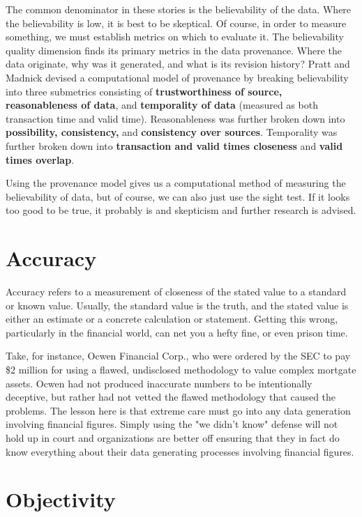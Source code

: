 The common denominator in these stories is the believability of the data. Where the believability is low, it is best to be skeptical.
Of course, in order to measure something, we must establish metrics on which to evaluate it. The believability quality dimension 
finds its primary metrics in the data provenance. Where the data originate, why was it generated, and what is its revision history? 
Pratt and Madnick \cite{provenance} devised a computational model of provenance by breaking believability into three submetrics 
consisting of \textbf{trustworthiness of source, reasonableness of data}, and \textbf{temporality of data} (measured as both transaction time and valid time). Reasonableness was further broken down into \textbf{possibility, consistency,} and \textbf{consistency over sources}. Temporality was further broken down into \textbf{transaction and valid times closeness} and \textbf{valid times overlap}.

Using the provenance model gives us a computational method of measuring the believability of data, but of course, we can also
just use the sight test. If it looks too good to be true, it probably is and skepticism and further research is advised.

\section{Accuracy}

Accuracy refers to a measurement of closeness of the stated value to a standard or known value. Usually, the standard value is
the truth, and the stated value is either an estimate or a concrete calculation or statement. Getting this wrong, particularly
in the financial world, can net you a hefty fine, or even prison time.

Take, for instance, Ocwen Financial Corp., who were ordered by the SEC to pay \$2 million for using a flawed, undisclosed
methodology to value complex mortgate assets. \cite{ocwen} \cite{ocwenreuters} Ocwen had not produced inaccurate numbers
to be intentionally deceptive, but rather had not vetted the flawed methodology that caused the problems. The lesson here
is that extreme care must go into any data generation involving financial figures. Simply using the "we didn't know" defense
will not hold up in court and organizations are better off ensuring that they in fact do know everything about their
data generating processes involving financial figures.

\section{Objectivity}

